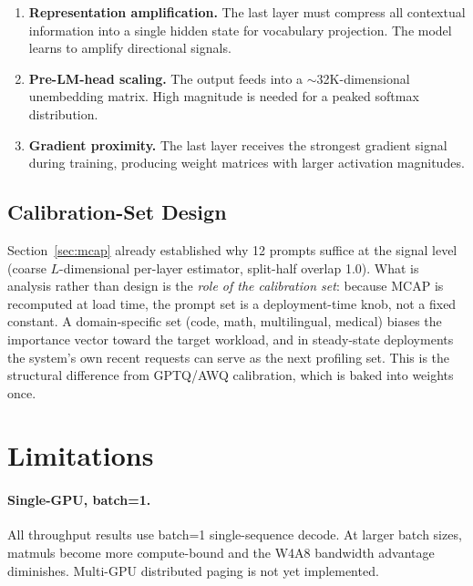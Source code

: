 \documentclass{article}
\begin{document}
\begin{enumerate}[leftmargin=*, itemsep=2pt]
\item \textbf{Representation amplification.} The last layer must compress all contextual
  information into a single hidden state for vocabulary projection. The model learns to
  amplify directional signals.

\item \textbf{Pre-LM-head scaling.} The output feeds into a $\sim$32K-dimensional
  unembedding matrix. High magnitude is needed for a peaked softmax distribution.

\item \textbf{Gradient proximity.} The last layer receives the strongest gradient signal
  during training, producing weight matrices with larger activation magnitudes.
\end{enumerate}

\subsection{Calibration-Set Design}
\label{sec:calibration}

Section~\ref{sec:mcap} already established why 12 prompts suffice at the signal level
(coarse $L$-dimensional per-layer estimator, split-half overlap 1.0). What is analysis
rather than design is the \emph{role of the calibration set}: because MCAP is recomputed
at load time, the prompt set is a deployment-time knob, not a fixed constant. A
domain-specific set (code, math, multilingual, medical) biases the importance vector
toward the target workload, and in steady-state deployments the system's own recent
requests can serve as the next profiling set. This is the structural difference from
GPTQ/AWQ calibration, which is baked into weights once.


\section{Limitations}
\label{sec:limitations}

\paragraph{Single-GPU, batch=1.} All throughput results use batch=1
single-sequence decode. At larger batch sizes, matmuls become more
compute-bound and the W4A8 bandwidth advantage diminishes. Multi-GPU
distributed paging is not yet implemented.
\end{document}
